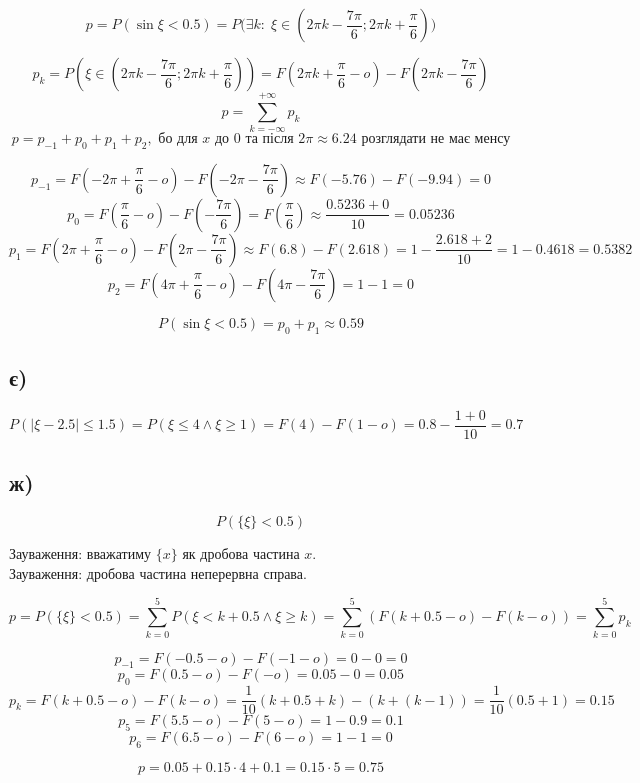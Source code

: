 \documentclass[11pt, a4paper]{article} %
\begin{document}
$$p = P(\sin \xi < 0.5) = P\bigl(\exists k:\; \xi \in (2\pi k - \frac{7\pi}{6};2\pi k + \frac{\pi}{6}) \bigr)$$

$$p_k = P(\xi \in (2\pi k - \frac{7\pi}{6};2\pi k + \frac{\pi}{6})) = F(2\pi k + \frac{\pi}{6} - o) - F(2\pi k - \frac{7\pi}{6})$$
$$p = \sum_{k=-\infty}^{+\infty}p_k$$
$$p = p_{-1} + p_0 + p_1 + p_2, \text{ бо для $x$ до $0$ та після $2\pi \approx 6.24$ розглядати не має менсу}$$

$$p_{-1} = F(-2\pi + \frac{\pi}{6} - o) - F(-2\pi-\frac{7\pi}{6}) \approx F(-5.76) - F(-9.94) = 0$$
$$p_0 = F(\frac{\pi}{6} - o) - F(-\frac{7\pi}{6}) = F(\frac{\pi}{6}) \approx \frac{0.5236 + 0}{10} = 0.05236$$
$$p_1 = F(2\pi + \frac{\pi}{6} - o) - F(2\pi-\frac{7\pi}{6}) \approx F(6.8) - F(2.618) = 1-\frac{2.618+2}{10} = 1 - 0.4618 = 0.5382$$
$$p_2 = F(4\pi + \frac{\pi}{6} - o) - F(4\pi-\frac{7\pi}{6}) = 1-1 = 0$$

$$P(\sin \xi < 0.5) = p_0 + p_1 \approx 0.59 $$

\subsection*{є)}
$$P(|\xi-2.5|\le 1.5) = P(\xi \le 4 \wedge \xi \ge 1) = F(4)-F(1-o) = 0.8 - \frac{1+0}{10} = 0.7$$

\subsection*{ж)}
$$P(\{\xi\} < 0.5)$$

\begin{mdframed}
    Зауваження: вважатиму $\{x\}$ як дробова частина $x$.\\
    Зауваження: дробова частина неперервна справа.
\end{mdframed}

$$p = P(\{\xi\} < 0.5) = \sum_{k=0}^{5} P(\xi < k+0.5 \wedge \xi \ge k) 
 = \sum_{k=0}^{5} (F(k+0.5-o) - F(k-o)) = \sum_{k=0}^{5} p_k$$

$$p_{-1} = F(-0.5-o) - F(-1-o) = 0-0 = 0$$
$$p_0 = F(0.5-o) - F(-o) = 0.05 - 0 = 0.05$$
$$p_k = F(k+0.5-o) - F(k-o) = \frac{1}{10} (k+0.5 + k) - (k + (k-1)) 
= \frac{1}{10} (0.5+1) = 0.15$$
$$p_5 = F(5.5-o) - F(5-o) = 1-0.9 = 0.1$$
$$p_6 = F(6.5-o) - F(6-o) = 1-1 = 0$$


$$p = 0.05 + 0.15 \cdot 4 + 0.1 = 0.15 \cdot 5 = 0.75$$
\end{document}

